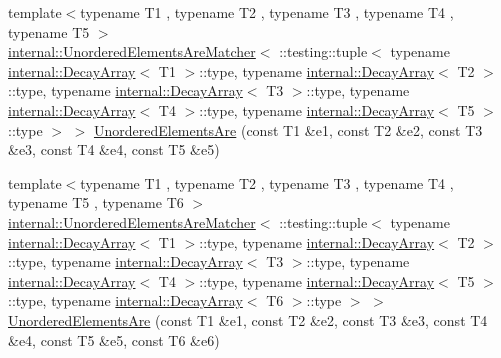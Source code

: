 \begin{DoxyCompactItemize}
\item 
{\footnotesize template$<$typename T1 , typename T2 , typename T3 , typename T4 , typename T5 $>$ }\\\hyperlink{classtesting_1_1internal_1_1_unordered_elements_are_matcher}{internal\+::\+Unordered\+Elements\+Are\+Matcher}$<$ \+::testing\+::tuple$<$ typename \hyperlink{structtesting_1_1internal_1_1_decay_array}{internal\+::\+Decay\+Array}$<$ T1 $>$\+::type, typename \hyperlink{structtesting_1_1internal_1_1_decay_array}{internal\+::\+Decay\+Array}$<$ T2 $>$\+::type, typename \hyperlink{structtesting_1_1internal_1_1_decay_array}{internal\+::\+Decay\+Array}$<$ T3 $>$\+::type, typename \hyperlink{structtesting_1_1internal_1_1_decay_array}{internal\+::\+Decay\+Array}$<$ T4 $>$\+::type, typename \hyperlink{structtesting_1_1internal_1_1_decay_array}{internal\+::\+Decay\+Array}$<$ T5 $>$\+::type $>$ $>$ \hyperlink{namespacetesting_a5e0ff76eb3f61b6c79b60311ceca73d3}{Unordered\+Elements\+Are} (const T1 \&e1, const T2 \&e2, const T3 \&e3, const T4 \&e4, const T5 \&e5)
\item 
{\footnotesize template$<$typename T1 , typename T2 , typename T3 , typename T4 , typename T5 , typename T6 $>$ }\\\hyperlink{classtesting_1_1internal_1_1_unordered_elements_are_matcher}{internal\+::\+Unordered\+Elements\+Are\+Matcher}$<$ \+::testing\+::tuple$<$ typename \hyperlink{structtesting_1_1internal_1_1_decay_array}{internal\+::\+Decay\+Array}$<$ T1 $>$\+::type, typename \hyperlink{structtesting_1_1internal_1_1_decay_array}{internal\+::\+Decay\+Array}$<$ T2 $>$\+::type, typename \hyperlink{structtesting_1_1internal_1_1_decay_array}{internal\+::\+Decay\+Array}$<$ T3 $>$\+::type, typename \hyperlink{structtesting_1_1internal_1_1_decay_array}{internal\+::\+Decay\+Array}$<$ T4 $>$\+::type, typename \hyperlink{structtesting_1_1internal_1_1_decay_array}{internal\+::\+Decay\+Array}$<$ T5 $>$\+::type, typename \hyperlink{structtesting_1_1internal_1_1_decay_array}{internal\+::\+Decay\+Array}$<$ T6 $>$\+::type $>$ $>$ \hyperlink{namespacetesting_aff1859501ecd94dd1bc428d146a66fdc}{Unordered\+Elements\+Are} (const T1 \&e1, const T2 \&e2, const T3 \&e3, const T4 \&e4, const T5 \&e5, const T6 \&e6)
\item 

\end{DoxyCompactItemize}
